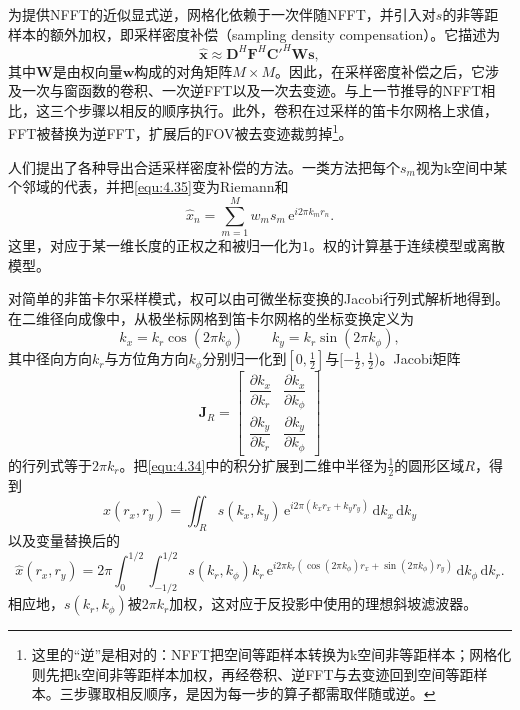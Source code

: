 \documentclass[12pt]{article}
\let\originallautoref\autoref
\renewcommand{\autoref}[1]{\allowbreak\originallautoref{#1}}
\begin{document}
为提供NFFT的近似显式逆，网格化依赖于一次伴随NFFT，并引入对$s$的非等距样本的额外加权，即采样密度补偿（sampling density compensation）。它描述为
\begin{equation}
    \hat{\bm{x}}\approx\mathbf{D}^H\mathbf{F}^H\mathbf{C}'^H\mathbf{W}\bm{s},
    \label{equ:4.38}
\end{equation}
其中$\mathbf{W}$是由权向量$\bm{w}$构成的对角矩阵$M\times M$。因此，在采样密度补偿之后，它涉及一次与窗函数的卷积、一次逆FFT以及一次去变迹。与上一节推导的NFFT相比，这三个步骤以相反的顺序执行。此外，卷积在过采样的笛卡尔网格上求值，FFT被替换为逆FFT，扩展后的FOV被去变迹裁剪掉\footnote{这里的“逆”是相对的：NFFT把空间等距样本转换为k空间非等距样本；网格化则先把k空间非等距样本加权，再经卷积、逆FFT与去变迹回到空间等距样本。三步骤取相反顺序，是因为每一步的算子都需取伴随或逆。}。

人们提出了各种导出合适采样密度补偿的方法。一类方法把每个$s_m$视为k空间中某个邻域的代表，并把\autoref{equ:4.35}变为Riemann和
\begin{equation}
    \hat{x}_n=\sum_{m=1}^{M}w_ms_m\,\mathrm{e}^{i2\pi k_mr_n}.
    \label{equ:4.39}
\end{equation}
这里，对应于某一维长度的正权之和被归一化为$1$。权的计算基于连续模型或离散模型。

对简单的非笛卡尔采样模式，权可以由可微坐标变换的Jacobi行列式解析地得到。在二维径向成像中，从极坐标网格到笛卡尔网格的坐标变换定义为
\begin{equation}
    k_x=k_r\cos(2\pi k_\phi)\qquad k_y=k_r\sin(2\pi k_\phi),
    \label{equ:4.40}
\end{equation}
其中径向方向$k_r$与方位角方向$k_\phi$分别归一化到$[0,\frac{1}{2}]$与$[-\frac{1}{2},\frac{1}{2})$。Jacobi矩阵
\begin{equation}
    \mathbf{J}_R=\begin{bmatrix}
        \dfrac{\partial k_x}{\partial k_r} & \dfrac{\partial k_x}{\partial k_\phi}\\[3mm]
        \dfrac{\partial k_y}{\partial k_r} & \dfrac{\partial k_y}{\partial k_\phi}
    \end{bmatrix}
    \label{equ:4.41}
\end{equation}
的行列式等于$2\pi k_r$。把\autoref{equ:4.34}中的积分扩展到二维中半径为$\frac{1}{2}$的圆形区域$R$，得到
\begin{equation}
    \hat{x}(r_x,r_y)=\iint_{R}s(k_x,k_y)\,\mathrm{e}^{i2\pi(k_xr_x+k_yr_y)}\,\mathrm{d}k_x\,\mathrm{d}k_y
    \label{equ:4.42}
\end{equation}
以及变量替换后的
\begin{equation}
    \hat{x}(r_x,r_y)=2\pi\int_{0}^{1/2}\int_{-1/2}^{1/2}s(k_r,k_\phi)k_r\,\mathrm{e}^{i2\pi k_r\left(\cos(2\pi k_\phi)r_x+\sin(2\pi k_\phi)r_y\right)}\,\mathrm{d}k_\phi\,\mathrm{d}k_r.
    \label{equ:4.43}
\end{equation}
相应地，$s(k_r,k_\phi)$被$2\pi k_r$加权，这对应于反投影中使用的理想斜坡滤波器。
\end{document}
